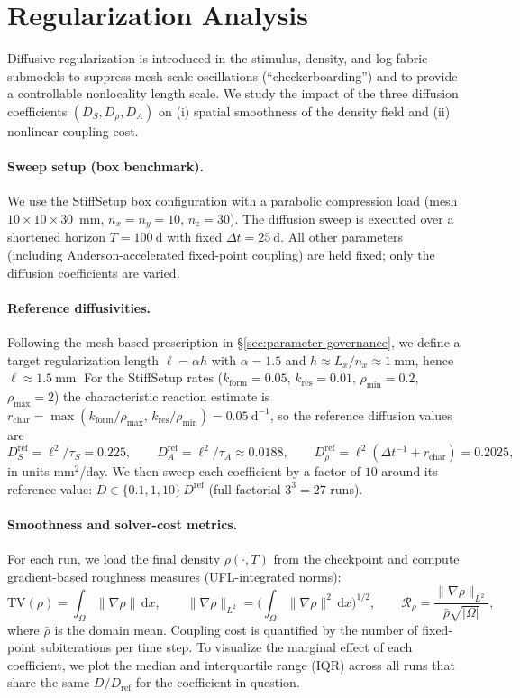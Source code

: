 \section*{Regularization Analysis}
\label{sec:regularization-analysis}

Diffusive regularization is introduced in the stimulus, density, and log-fabric submodels to suppress mesh-scale oscillations (``checkerboarding'') and to provide a controllable nonlocality length scale.
We study the impact of the three diffusion coefficients $(D_S,D_\rho,D_A)$ on (i) spatial smoothness of the density field and (ii) nonlinear coupling cost.

\paragraph{Sweep setup (box benchmark).}
We use the StiffSetup box configuration with a parabolic compression load (mesh $10\times 10\times 30$~mm, $n_x=n_y=10$, $n_z=30$).
The diffusion sweep is executed over a shortened horizon $T=100~\mathrm{d}$ with fixed $\Delta t=25~\mathrm{d}$.
All other parameters (including Anderson-accelerated fixed-point coupling) are held fixed; only the diffusion coefficients are varied.

\paragraph{Reference diffusivities.}
Following the mesh-based prescription in \S\ref{sec:parameter-governance}, we define a target regularization length $\ell=\alpha h$ with $\alpha=1.5$ and $h\approx L_x/n_x\approx 1~\mathrm{mm}$, hence $\ell\approx 1.5~\mathrm{mm}$.
For the StiffSetup rates ($k_{\mathrm{form}}=0.05$, $k_{\mathrm{res}}=0.01$, $\rho_{\min}=0.2$, $\rho_{\max}=2$) the characteristic reaction estimate is $r_{\mathrm{char}}=\max(k_{\mathrm{form}}/\rho_{\max},\,k_{\mathrm{res}}/\rho_{\min})=0.05~\mathrm{d^{-1}}$, so the reference diffusion values are
\[
D_S^{\mathrm{ref}}=\ell^2/\tau_S=0.225,\qquad
D_A^{\mathrm{ref}}=\ell^2/\tau_A\approx 0.0188,\qquad
D_\rho^{\mathrm{ref}}=\ell^2(\Delta t^{-1}+r_{\mathrm{char}})=0.2025,
\]
in units mm$^2$/day.
We then sweep each coefficient by a factor of $10$ around its reference value: $D\in\{0.1,1,10\}\,D^{\mathrm{ref}}$ (full factorial $3^3=27$ runs).

\paragraph{Smoothness and solver-cost metrics.}
For each run, we load the final density $\rho(\cdot,T)$ from the checkpoint and compute gradient-based roughness measures (UFL-integrated norms):
\[
\mathrm{TV}(\rho)=\int_\Omega \|\nabla\rho\|\,\mathrm{d}x,\qquad
\|\nabla\rho\|_{L^2}=\Big(\int_\Omega \|\nabla\rho\|^2\,\mathrm{d}x\Big)^{1/2},\qquad
\mathcal{R}_\rho=\frac{\|\nabla\rho\|_{L^2}}{\bar{\rho}\sqrt{|\Omega|}},
\]
where $\bar{\rho}$ is the domain mean.
Coupling cost is quantified by the number of fixed-point subiterations per time step.
To visualize the marginal effect of each coefficient, we plot the median and interquartile range (IQR) across all runs that share the same $D/D_{\mathrm{ref}}$ for the coefficient in question.

